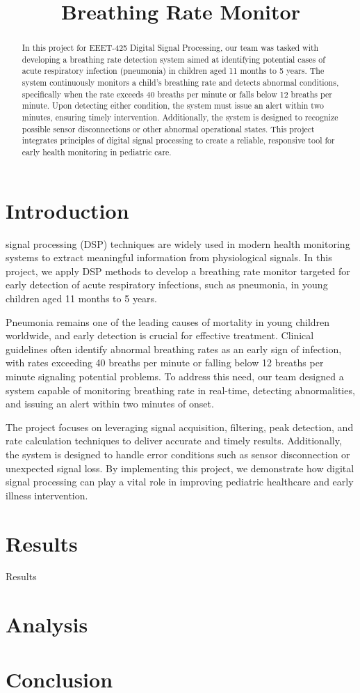 \documentclass[journal]{IEEEtran}
\title{Breathing Rate Monitor}
\author{
    \IEEEauthorblockN{Argenis Aquino, Rachel DuBois, Diego Lopez, Jonathan Sumner \\}
    \IEEEauthorblockA{
        Department of Engineering Technology, Rochester Institute of Technology\\
        1 Lomb Memorial Drive, Rochester NY, 14623, United States of America \\}
}
\begin{document}
\maketitle

\begin{abstract}
In this project for EEET-425 Digital Signal Processing, our team was tasked with developing a breathing rate detection system aimed at identifying potential cases of acute respiratory infection (pneumonia) in children aged 11 months to 5 years. The system continuously monitors a child's breathing rate and detects abnormal conditions, specifically when the rate exceeds 40 breaths per minute or falls below 12 breaths per minute. Upon detecting either condition, the system must issue an alert within two minutes, ensuring timely intervention. Additionally, the system is designed to recognize possible sensor disconnections or other abnormal operational states. This project integrates principles of digital signal processing to create a reliable, responsive tool for early health monitoring in pediatric care.
\end{abstract}

\section{Introduction}
 signal processing (DSP) techniques are widely used in modern health monitoring systems to extract meaningful information from physiological signals. In this project, we apply DSP methods to develop a breathing rate monitor targeted for early detection of acute respiratory infections, such as pneumonia, in young children aged 11 months to 5 years.

Pneumonia remains one of the leading causes of mortality in young children worldwide, and early detection is crucial for effective treatment. Clinical guidelines often identify abnormal breathing rates as an early sign of infection, with rates exceeding 40 breaths per minute or falling below 12 breaths per minute signaling potential problems. To address this need, our team designed a system capable of monitoring breathing rate in real-time, detecting abnormalities, and issuing an alert within two minutes of onset.

The project focuses on leveraging signal acquisition, filtering, peak detection, and rate calculation techniques to deliver accurate and timely results. Additionally, the system is designed to handle error conditions such as sensor disconnection or unexpected signal loss. By implementing this project, we demonstrate how digital signal processing can play a vital role in improving pediatric healthcare and early illness intervention.

\section{Results}
Results


\section{Analysis}

\section{Conclusion}
\end{document}
